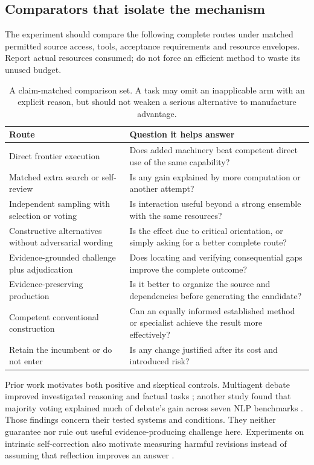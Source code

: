 \subsection{Comparators that isolate the mechanism}
The experiment should compare the following complete routes under matched permitted source access, tools, acceptance requirements and resource envelopes. Report actual resources consumed; do not force an efficient method to waste its unused budget.
\begin{table}[htbp]
\small
\begin{tabularx}{\textwidth}{P{1.52in}Y}
\toprule
\textbf{Route} & \textbf{Question it helps answer}\\
\midrule
Direct frontier execution & Does added machinery beat competent direct use of the same capability?\\
Matched extra search or self-review & Is any gain explained by more computation or another attempt?\\
Independent sampling with selection or voting & Is interaction useful beyond a strong ensemble with the same resources?\\
Constructive alternatives without adversarial wording & Is the effect due to critical orientation, or simply asking for a better complete route?\\
Evidence-grounded challenge plus adjudication & Does locating and verifying consequential gaps improve the complete outcome?\\
Evidence-preserving production & Is it better to organize the source and dependencies before generating the candidate?\\
Competent conventional construction & Can an equally informed established method or specialist achieve the result more effectively?\\
Retain the incumbent or do not enter & Is any change justified after its cost and introduced risk?\\
\bottomrule
\end{tabularx}
\caption{A claim-matched comparison set. A task may omit an inapplicable arm with an explicit reason, but should not weaken a serious alternative to manufacture advantage.}
\end{table}

Prior work motivates both positive and skeptical controls. Multiagent debate improved investigated reasoning and factual tasks \citep{multidebate}; another study found that majority voting explained much of debate's gain across seven NLP benchmarks \citep{voting}. Those findings concern their tested systems and conditions. They neither guarantee nor rule out useful evidence-producing challenge here. Experiments on intrinsic self-correction also motivate measuring harmful revisions instead of assuming that reflection improves an answer \citep{selfcorrection}.

